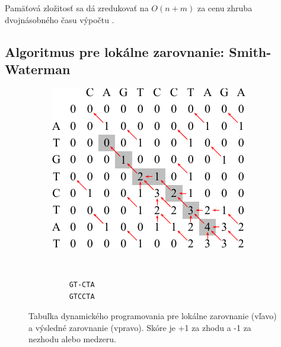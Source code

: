 Pamäťová zložitosť sa dá zredukovať na $O(n+m)$ za cenu zhruba dvojnásobného času výpočtu \cite{hirschberg}.

\subsection{Algoritmus pre lokálne zarovnanie: Smith-Waterman}


\begin{figure}[htp]
    \centering
    \begin{subfigure}[m]{0.5\textwidth}
    \centering
    \includegraphics[width=\textwidth]{images/local_alignment}
    \end{subfigure}
    ~
    \begin{subfigure}[m]{0.3\textwidth}
    \centering
    \begin{verbatim}
    GT-CTA
    GTCCTA
    \end{verbatim}
    \end{subfigure}
    \caption[Tabuľka dyn. programovania pre  lokálne zarovnanie]{Tabuľka dynamického programovania pre  lokálne zarovnanie (vľavo) a výsledné zarovnanie (vpravo). Skóre je +1 za zhodu a -1 za nezhodu alebo medzeru.}
    \label{fig:local-align}
\end{figure}

